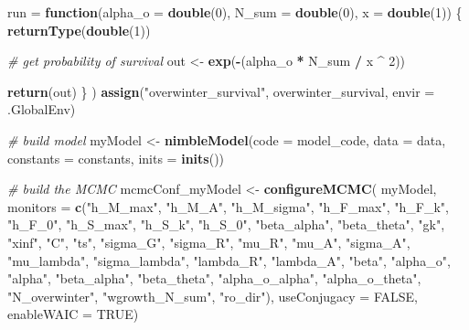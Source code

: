 \documentclass[
]{article}
\newenvironment{Shaded}{\begin{snugshade}}{\end{snugshade}}
\newcommand{\AttributeTok}[1]{\textcolor[rgb]{0.13,0.29,0.53}{#1}}
\newcommand{\CommentTok}[1]{\textcolor[rgb]{0.56,0.35,0.01}{\textit{#1}}}
\newcommand{\ConstantTok}[1]{\textcolor[rgb]{0.56,0.35,0.01}{#1}}
\newcommand{\ControlFlowTok}[1]{\textcolor[rgb]{0.13,0.29,0.53}{\textbf{#1}}}
\newcommand{\DecValTok}[1]{\textcolor[rgb]{0.00,0.00,0.81}{#1}}
\newcommand{\FunctionTok}[1]{\textcolor[rgb]{0.13,0.29,0.53}{\textbf{#1}}}
\newcommand{\NormalTok}[1]{#1}
\newcommand{\OtherTok}[1]{\textcolor[rgb]{0.56,0.35,0.01}{#1}}
\newcommand{\SpecialCharTok}[1]{\textcolor[rgb]{0.81,0.36,0.00}{\textbf{#1}}}
\newcommand{\StringTok}[1]{\textcolor[rgb]{0.31,0.60,0.02}{#1}}
\begin{document}
\begin{Shaded}
\begin{Highlighting}[]
    \AttributeTok{run =} \ControlFlowTok{function}\NormalTok{(}\AttributeTok{alpha\_o =} \FunctionTok{double}\NormalTok{(}\DecValTok{0}\NormalTok{), }\AttributeTok{N\_sum =} \FunctionTok{double}\NormalTok{(}\DecValTok{0}\NormalTok{),}
                   \AttributeTok{x =} \FunctionTok{double}\NormalTok{(}\DecValTok{1}\NormalTok{))}
\NormalTok{    \{}
      \FunctionTok{returnType}\NormalTok{(}\FunctionTok{double}\NormalTok{(}\DecValTok{1}\NormalTok{))}
      
      \CommentTok{\# get probability of survival}
\NormalTok{      out }\OtherTok{\textless{}{-}} \FunctionTok{exp}\NormalTok{(}\SpecialCharTok{{-}}\NormalTok{(alpha\_o }\SpecialCharTok{*}\NormalTok{ N\_sum }\SpecialCharTok{/}\NormalTok{ x }\SpecialCharTok{\^{}} \DecValTok{2}\NormalTok{))}
      
      \FunctionTok{return}\NormalTok{(out)}
\NormalTok{    \}}
\NormalTok{  )}
  \FunctionTok{assign}\NormalTok{(}\StringTok{"overwinter\_survival"}\NormalTok{, overwinter\_survival, }\AttributeTok{envir =}\NormalTok{ .GlobalEnv)}
  
  
  \CommentTok{\# build model}
\NormalTok{  myModel }\OtherTok{\textless{}{-}} \FunctionTok{nimbleModel}\NormalTok{(}\AttributeTok{code =}\NormalTok{ model\_code,}
                         \AttributeTok{data =}\NormalTok{ data,}
                         \AttributeTok{constants =}\NormalTok{ constants,}
                         \AttributeTok{inits =} \FunctionTok{inits}\NormalTok{())}
  
  
  \CommentTok{\# build the MCMC}
\NormalTok{  mcmcConf\_myModel }\OtherTok{\textless{}{-}} \FunctionTok{configureMCMC}\NormalTok{(}
\NormalTok{    myModel,}
    \AttributeTok{monitors =} \FunctionTok{c}\NormalTok{(}\StringTok{"h\_M\_max"}\NormalTok{, }\StringTok{"h\_M\_A"}\NormalTok{, }\StringTok{"h\_M\_sigma"}\NormalTok{, }\StringTok{"h\_F\_max"}\NormalTok{,}
                 \StringTok{"h\_F\_k"}\NormalTok{, }\StringTok{"h\_F\_0"}\NormalTok{, }\StringTok{"h\_S\_max"}\NormalTok{, }\StringTok{"h\_S\_k"}\NormalTok{,}
                 \StringTok{"h\_S\_0"}\NormalTok{, }\StringTok{"beta\_alpha"}\NormalTok{, }\StringTok{"beta\_theta"}\NormalTok{, }\StringTok{"gk"}\NormalTok{,}
                 \StringTok{"xinf"}\NormalTok{, }\StringTok{"C"}\NormalTok{, }\StringTok{"ts"}\NormalTok{, }\StringTok{"sigma\_G"}\NormalTok{,}
                 \StringTok{"sigma\_R"}\NormalTok{, }\StringTok{"mu\_R"}\NormalTok{, }\StringTok{"mu\_A"}\NormalTok{,}
                 \StringTok{"sigma\_A"}\NormalTok{, }\StringTok{"mu\_lambda"}\NormalTok{, }\StringTok{"sigma\_lambda"}\NormalTok{,}
                 \StringTok{"lambda\_R"}\NormalTok{, }\StringTok{"lambda\_A"}\NormalTok{, }\StringTok{"beta"}\NormalTok{, }\StringTok{"alpha\_o"}\NormalTok{,}
                 \StringTok{"alpha"}\NormalTok{, }\StringTok{"beta\_alpha"}\NormalTok{, }\StringTok{"beta\_theta"}\NormalTok{,}
                 \StringTok{"alpha\_o\_alpha"}\NormalTok{, }\StringTok{"alpha\_o\_theta"}\NormalTok{, }\StringTok{"N\_overwinter"}\NormalTok{,}
                 \StringTok{"wgrowth\_N\_sum"}\NormalTok{, }\StringTok{"ro\_dir"}\NormalTok{),}
    \AttributeTok{useConjugacy =} \ConstantTok{FALSE}\NormalTok{, }\AttributeTok{enableWAIC =} \ConstantTok{TRUE}\NormalTok{)}


\end{Highlighting}
\end{Shaded}
\end{document}
